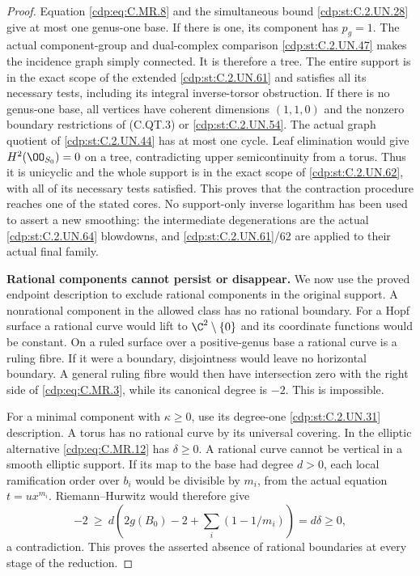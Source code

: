 \begin{proof}
Equation \eqref{cdp:eq:C.MR.8} and the
simultaneous bound \ref{cdp:st:C.2.UN.28} give
at most one genus-one base.
If there is one, its component
has $p_g=1$. The actual
component-group and dual-complex
comparison \ref{cdp:st:C.2.UN.47} makes the
incidence graph simply connected.
It is therefore a tree. The
entire support is in the exact
scope of the extended \ref{cdp:st:C.2.UN.61}
and satisfies all its necessary
tests, including its integral
inverse-torsor obstruction.
If there is no genus-one base,
all vertices have coherent
dimensions $(1,1,0)$ and the
nonzero boundary restrictions
of (C.QT.3) or \ref{cdp:st:C.2.UN.54}.
The actual graph quotient of
\ref{cdp:st:C.2.UN.44} has at most one cycle.
Leaf elimination would give
$H^2(\OO_{S_0})=0$ on a tree,
contradicting upper
semicontinuity from a torus.
Thus it is unicyclic and the
whole support is in the exact
scope of \ref{cdp:st:C.2.UN.62}, with all of
its necessary tests satisfied.
This proves that the
contraction procedure reaches
one of the stated cores.
No support-only inverse
logarithm has been used to
assert a new smoothing:
the intermediate degenerations
are the actual \ref{cdp:st:C.2.UN.64} blowdowns,
and \ref{cdp:st:C.2.UN.61}/62 are applied to
their actual final family.

\par\medskip\noindent\textbf{Rational components cannot persist or disappear.}
We now use the proved endpoint
description to exclude rational
components in the original
support. A nonrational
component in the allowed class
has no rational boundary.
For a Hopf surface a rational
curve would lift to
$\C^2\setminus\{0\}$ and its
coordinate functions would be
constant. On a ruled surface
over a positive-genus base a
rational curve is a ruling
fibre. If it were a boundary,
disjointness would leave no
horizontal boundary. A general
ruling fibre would then have
intersection zero with the
right side of \eqref{cdp:eq:C.MR.3}, while
its canonical degree is $-2$.
This is impossible.

For a minimal component with
$\kappa\ge0$, use its degree-one
\ref{cdp:st:C.2.UN.31} description. A torus has
no rational curve by its
universal covering. In the
elliptic alternative \eqref{cdp:eq:C.MR.12}
has $\delta\ge0$. A rational
curve cannot be vertical in
a smooth elliptic support.
If its map to the base had
degree $d>0$, each local
ramification order over $b_i$
would be divisible by $m_i$,
from the actual equation
$t=u x^{m_i}$. Riemann--Hurwitz
would therefore give
\[
 -2\ \ge\
 d\left(2g(B_0)-2+
              \sum_i(1-1/m_i)\right)
                              =d\delta\ge0,
\tag{C.MR.15}\label{cdp:eq:C.MR.15}
\]
a contradiction. This proves
the asserted absence of
rational boundaries at every
stage of the reduction.


\end{proof}
